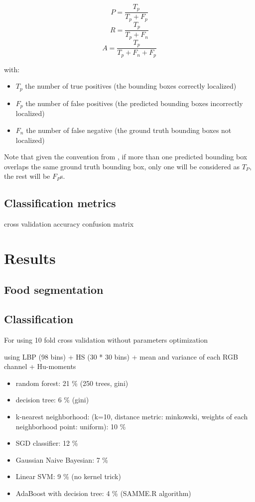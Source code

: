 $$ P =  \frac{T_p}{T_p + F_p}$$
$$ R =  \frac{T_p}{T_p + F_n}$$
$$ A = \frac{T_p}{T_p + F_n + F_p} $$

with:
\begin{itemize}
   \item $T_p$ the number of true positives (the bounding boxes correctly localized)
   \item $F_p$ the number of false positives (the predicted bounding boxes incorrectly localized)
   \item $F_n$ the number of false negative (the ground truth bounding boxes not localized)
\end{itemize}

Note that given the convention from \cite{pascalVoc2012}, if more than one predicted bounding box overlaps the same ground truth bounding box, only one will be considered as $T_P$, the rest will be $F_P$s.

\subsection{Classification metrics}

cross validation
accuracy
confusion matrix

\section{Results}
\subsection{Food segmentation}



\subsection{Classification}

For using 10 fold cross validation
without parameters optimization

using LBP (98 bins) + HS (30 * 30 bins) + mean and variance of each RGB channel + Hu-moments
\begin{itemize}
    \item random forest: 21 \% (250 trees, gini)
    \item decision tree: 6 \% (gini)
    \item k-nearest neighborhood: (k=10, distance metric: minkowski, weights of each neighborhood point: uniform): 10 \%
    \item SGD classifier:  12 \%
    \item Gaussian Naive Bayesian: 7 \%
    \item Linear SVM: 9 \% (no kernel trick)
    \item AdaBoost with decision tree: 4 \% (SAMME.R algorithm)
\end{itemize}

